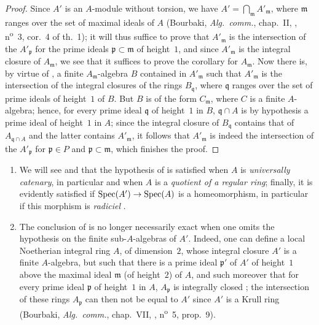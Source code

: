 \begin{proof}
Since $A'$ is an $A$-module without torsion, we have $A'=\bigcap_{\mathfrak m}A'_\mathfrak{m}$, where $\mathfrak{m}$ ranges over the set of maximal ideals of $A$ (Bourbaki, \emph{Alg.~comm.}, chap.~II, , n\textsuperscript{o}~3, cor.~4 of th.~1);
it will thus suffice to prove that $A'_\mathfrak{m}$ is the intersection of the $A'_\mathfrak{p}$ for the prime ideals $\mathfrak{p}\subset\mathfrak{m}$ of height~$1$, and since $A'_\mathfrak{m}$ is the integral closure of $A_\mathfrak{m}$, we see that it suffices to prove the corollary for $A_\mathfrak{m}$.
Now there is, by virtue of , a finite $A_\mathfrak{m}$-algebra $B$ contained in $A'_\mathfrak{m}$ such that $A'_\mathfrak{m}$ is the intersection of the integral closures of the rings $B_\mathfrak{q}$, where $\mathfrak{q}$ ranges over the set of prime ideals of height~$1$ of $B$.
But $B$ is of the form $C_\mathfrak{m}$, where $C$ is a finite $A$-algebra; hence, for every prime ideal $\mathfrak{q}$ of height~$1$ in $B$, $\mathfrak{q}\cap A$ is by hypothesis a prime ideal of height~$1$ in $A$; since the integral closure of $B_\mathfrak{q}$ contains that of $A_{\mathfrak{q}\cap A}$ and the latter contains $A'_\mathfrak{m}$, it follows that $A'_\mathfrak{m}$ is indeed the intersection of the $A'_\mathfrak{p}$ for $\mathfrak{p}\in P$ and $\mathfrak{p}\subset\mathfrak{m}$, which finishes the proof.
\end{proof}

\begin{remarks}[23.2.10]
\label{0.23.2.10}
\medskip\noindent
\begin{enumerate}
  \item[{\rm(i)}] We will see  and  that the hypothesis of  is satisfied when $A$ is \emph{universally catenary}, in particular  and  when $A$ is a \emph{quotient of a regular ring}; finally, it is evidently satisfied if $\operatorname{Spec}(A')\to\operatorname{Spec}(A)$ is a homeomorphism, in particular if this morphism is \emph{radiciel} .
  \item[{\rm(ii)}] The conclusion of  is no longer necessarily exact when one omits the hypothesis on the finite sub-$A$-algebras of $A'$.
    Indeed, one can define a local Noetherian integral ring $A$, of dimension~$2$, whose integral closure $A'$ is a finite $A$-algebra, but such that there is a prime ideal $\mathfrak{p}'$ of $A'$ of height~$1$ above the maximal ideal $\mathfrak{m}$ (of height~$2$) of $A$, and such moreover that for every prime ideal $\mathfrak{p}$ of height~$1$ in $A$, $A_\mathfrak{p}$ is integrally closed ; the intersection of these rings $A_\mathfrak{p}$ can then not be equal to $A'$ since $A'$ is a Krull ring (Bourbaki, \emph{Alg.~comm.}, chap.~VII, , n\textsuperscript{o}~5, prop.~9).
\end{enumerate}
\end{remarks}
